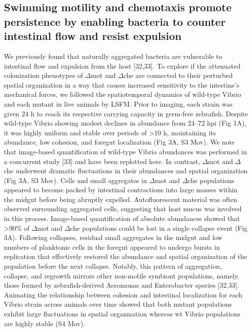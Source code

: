 \subsection{Swimming motility and chemotaxis promote persistence by enabling bacteria to counter intestinal flow and resist expulsion}
We previously found that naturally aggregated bacteria are vulnerable to intestinal flow and expulsion from the host [32,33]. To explore if the attenuated colonization phenotypes of $\Delta$mot and $\Delta$che are connected to their perturbed spatial organization in a way that causes increased sensitivity to the intestine's mechanical forces, we followed the spatiotemporal dynamics of wild-type Vibrio and each mutant in live animals by LSFM. Prior to imaging, each strain was given 24 h to reach its respective carrying capacity in germ-free zebrafish. Despite wild-type Vibrio showing modest declines in abundance from 24–72 hpi (Fig 1A), it was highly uniform and stable over periods of >10 h, maintaining its abundance, low cohesion, and foregut localization (Fig 3A, S3 Mov). We note that image-based quantification of wild-type Vibrio abundances was performed in a concurrent study [33] and have been replotted here. In contrast, $\Delta$mot and $\Delta$che underwent dramatic fluctuations in their abundances and spatial organization (Fig 3A, S3 Mov). Cells and small aggregates in $\Delta$mot and $\Delta$che populations appeared to become packed by intestinal contractions into large masses within the midgut before being abruptly expelled. Autofluorescent material was often observed surrounding aggregated cells, suggesting that host mucus was involved in this process. Image-based quantification of absolute abundances showed that >90\% of $\Delta$mot and $\Delta$che populations could be lost in a single collapse event (Fig 3A). Following collapses, residual small aggregates in the midgut and low numbers of planktonic cells in the foregut appeared to undergo bursts in replication that effectively restored the abundance and spatial organization of the population before the next collapse. Notably, this pattern of aggregation, collapse, and regrowth mirrors other non-motile symbiont populations, namely, those formed by zebrafish-derived Aeromonas and Enterobacter species [32,33]. Animating the relationship between cohesion and intestinal localization for each Vibrio strain across animals over time showed that both mutant populations exhibit large fluctuations in spatial organization whereas wt Vibrio populations are highly stable (S4 Mov).

